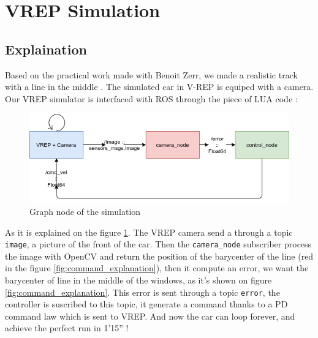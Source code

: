 \section{VREP Simulation}

\subsection{Explaination}

Based on the practical work made with Benoit Zerr, we made a realistic track with a line in the middle \cite{zerr}.
The simulated car in V-REP is equiped with a camera. Our VREP simulator is interfaced with ROS through the piece of LUA code :

\begin{figure}[ht!]
    \begin{center}
        \includegraphics[scale=0.5]{Images/graph_node_simulation.png}
    \end{center}
    \caption{Graph node of the simulation}
    \label{fig:graph_node_simulation}

\end{figure}

As it is explained on the figure \ref{fig:graph_node_simulation}. The VREP camera send a through a topic \texttt{image}, a picture of the front of the car. 
Then the \texttt{camera\_node} subscriber process the image with OpenCV and return the position
of the barycenter of the line (red in the figure \ref{fig:command_explanation}), then it compute an error, we want the barycenter of line in the middle of the windows, as it's shown on figure \ref{fig:command_explanation}. 
This error is sent through a topic \texttt{error}, the controller is suscribed to this topic,
it generate a command thanks to a PD command law which is sent to VREP. And now the car can loop forever, and achieve 
the perfect run in 1'15'' !

